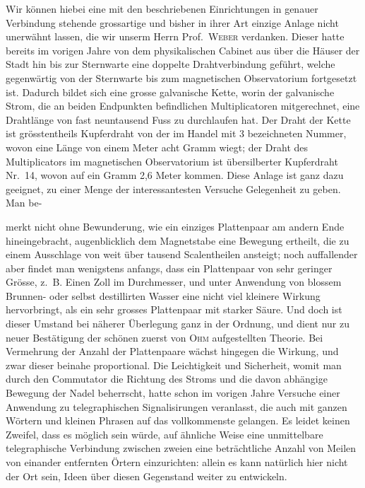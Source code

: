Wir können hiebei eine mit den beschriebenen Einrichtungen in genauer Verbindung stehende grossartige und bisher in ihrer Art einzige Anlage nicht unerwähnt lassen, die wir unserm Herrn Prof.\ \textsc{Weber} verdanken. Dieser hatte bereits im vorigen Jahre von dem physikalischen Cabinet aus über die Häuser der Stadt hin bis zur Sternwarte eine doppelte Drahtverbindung geführt, welche gegenwärtig von der Sternwarte bis zum magnetischen Observatorium fortgesetzt ist. Dadurch bildet sich eine grosse galvanische Kette, worin der galvanische Strom, die an beiden Endpunkten befindlichen Multiplicatoren mitgerechnet, eine Drahtlänge von fast neuntausend Fuss zu durchlaufen hat. Der Draht der Kette ist grösstentheils Kupferdraht von der im Handel mit 3 bezeichneten Nummer, wovon eine Länge von einem Meter acht Gramm wiegt; der Draht des Multiplicators im magnetischen Observatorium ist übersilberter Kupferdraht Nr.\ 14, wovon auf ein Gramm 2,6 Meter kommen. Diese Anlage ist ganz dazu geeignet, zu einer Menge der interessantesten Versuche Gelegenheit zu geben. Man be-
\par\clearpage
{}
\noindent merkt nicht ohne Bewunderung, wie ein einziges Plattenpaar am andern Ende hineingebracht, augenblicklich dem Magnetstabe eine Bewegung ertheilt, die zu einem Ausschlage von weit über tausend Scalentheilen ansteigt; noch auffallender aber findet man wenigstens anfangs, dass ein Plattenpaar von sehr geringer Grösse, z.\ B. Einen Zoll im Durchmesser, und unter Anwendung von blossem Brunnen- oder selbst destillirten Wasser eine nicht viel kleinere Wirkung hervorbringt, als ein sehr grosses Plattenpaar mit starker Säure. Und doch ist dieser Umstand bei näherer Überlegung ganz in der Ordnung, und dient nur zu neuer Bestätigung der schönen zuerst von \textsc{Ohm} aufgestellten Theorie. Bei Vermehrung der Anzahl der Plattenpaare wächst hingegen die Wirkung, und zwar dieser beinahe proportional. Die Leichtigkeit und Sicherheit, womit man durch den Commutator die Richtung des Stroms und die davon abhängige Bewegung der Nadel beherrscht, hatte schon im vorigen Jahre Versuche einer Anwendung zu telegraphischen Signalisirungen veranlasst, die auch mit ganzen Wörtern und kleinen Phrasen auf das vollkommenste gelangen. Es leidet keinen Zweifel, dass es möglich sein würde, auf ähnliche Weise eine unmittelbare telegraphische Verbindung zwischen zweien eine beträchtliche Anzahl von Meilen von einander entfernten Örtern einzurichten: allein es kann natürlich hier nicht der Ort sein, Ideen über diesen Gegenstand weiter zu entwickeln.

